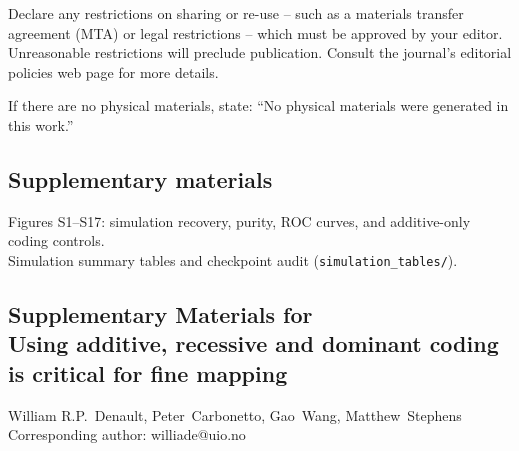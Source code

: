 \documentclass[12pt]{article}
\def\scititle{
	Using additive, recessive and dominant coding is critical for fine mapping 
}
\begin{document}
Declare any restrictions on sharing or re-use -- such as a materials transfer agreement (MTA) or
legal restrictions -- which must be approved by your editor.
Unreasonable restrictions will preclude publication.
Consult the journal's editorial policies web page for more details.

If there are no physical materials, state:
``No physical materials were generated in this work.''


\subsection*{Supplementary materials}
Figures S1--S17: simulation recovery, purity, ROC curves, and additive-only coding controls.\\
Simulation summary tables and checkpoint audit (\texttt{simulation\_tables/}).

\clearpage
\renewcommand{\thefigure}{S\arabic{figure}}
\renewcommand{\thetable}{S\arabic{table}}
\renewcommand{\theequation}{S\arabic{equation}}
\renewcommand{\thepage}{S\arabic{page}}
\setcounter{figure}{0}
\setcounter{table}{0}
\setcounter{equation}{0}
\setcounter{page}{1}
\begin{center}
\section*{Supplementary Materials for\\ \scititle}
William R.P.~Denault, Peter~Carbonetto, Gao~Wang, Matthew~Stephens\\
Corresponding author: williade@uio.no
\end{center}
\end{document}
